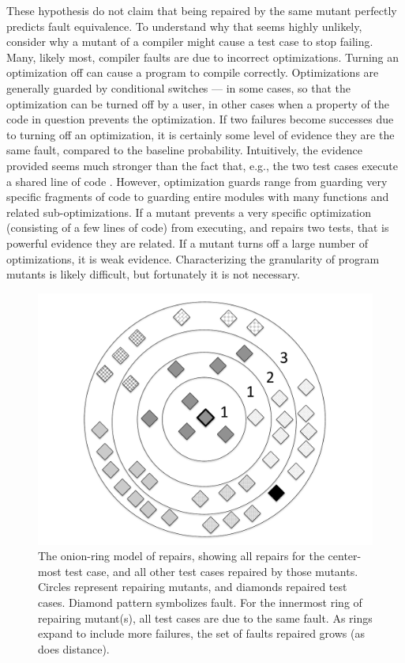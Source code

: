 These hypothesis do not claim that being repaired by the same mutant perfectly predicts fault equivalence.  To understand why that seems highly unlikely, consider why a mutant of a compiler might cause a test case to stop failing.  Many, likely most, compiler faults are due to incorrect optimizations.  Turning an optimization off can cause a program to compile correctly.  Optimizations are generally guarded by conditional switches --- in some cases, so that the optimization can be turned off by a user, in other cases when a property of the code in question prevents the optimization.  If two failures become successes due to turning off an optimization, it is certainly some level of evidence they are the same fault, compared to the baseline probability.  Intuitively, the evidence provided seems much stronger than the fact that, e.g., the two test cases execute a shared line of code \cite{RepsSpectra}.  However, optimization guards range from guarding very specific fragments of code to guarding entire modules with many functions and related sub-optimizations.  If a mutant prevents a very specific optimization (consisting of a few lines of code) from executing, and repairs two tests, that is powerful evidence they are related.  If a mutant turns off a large number of optimizations, it is weak evidence.  Characterizing the granularity of program mutants is likely difficult, but fortunately it is not necessary.

\begin{figure}
\centering
\includegraphics[width=0.6\columnwidth]{onionring}
\caption{\scriptsize{The onion-ring model of repairs, showing all repairs for the center-most test case, and all other test cases repaired by those mutants.  Circles represent repairing mutants, and diamonds repaired test cases.  Diamond pattern symbolizes fault.  For the innermost ring of repairing mutant(s), all test cases are due to the same fault.  As rings expand to include more failures, the set of faults repaired grows (as does distance).}}
\label{fig:onion}
\end{figure}

